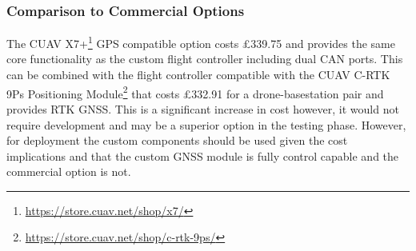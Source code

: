\subsubsection{Comparison to Commercial Options}
The CUAV X7+\footnote{\url{https://store.cuav.net/shop/x7/}} GPS compatible option costs £339.75 and provides the same core functionality as the custom flight controller including dual \gls{CAN} ports. This can be combined with the flight controller compatible with the CUAV C-RTK 9Ps Positioning Module\footnote{\url{https://store.cuav.net/shop/c-rtk-9ps/}} that costs £332.91 for a drone-basestation pair and provides \gls{RTK} \gls{GNSS}. This is a significant increase in cost however, it would not require development and may be a superior option in the testing phase. However, for deployment the custom components should be used given the cost implications and that the custom \gls{GNSS} module is fully control capable and the commercial option is not. 
